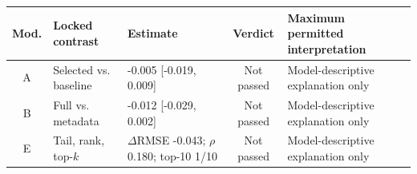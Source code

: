 \begin{tabular}{@{}cp{}p{}cp{}@{}}
\toprule
Mod. & Locked contrast & Estimate & Verdict & Maximum permitted interpretation \\
\midrule
A & Selected vs. baseline & -0.005 [-0.019, 0.009] & Not passed & Model-descriptive explanation only \\
B & Full vs. metadata & -0.012 [-0.029, 0.002] & Not passed & Model-descriptive explanation only \\
E & Tail, rank, top-$k$ & $\Delta$RMSE -0.043; $\rho$ 0.180; top-10 1/10 & Not passed & Model-descriptive explanation only \\
\bottomrule
\end{tabular}
